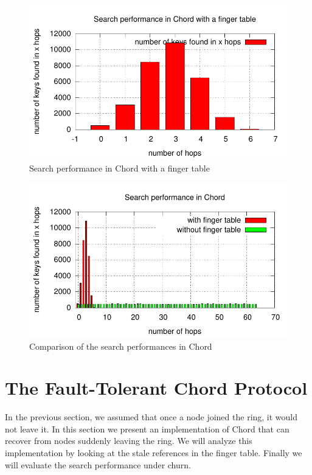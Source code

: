 \message{ !name(LSDS_project2_hayezl.tex)}\documentclass[a4paper, 11pt]{article}
\theoremstyle{plain}
\theoremstyle{definition}
\begin{document}
    \begin{figure}[h]
      \centering
      \includegraphics{plots/task2-5-cluster.pdf}
      \caption{Search performance in Chord with a finger table}
      \label{fig:search-perf-chord-fing-table}
    \end{figure}

    \begin{figure}[h]
      \centering
      \includegraphics{plots/task2-5-cluster-compar.pdf}
      \caption{Comparison of the search performances in Chord}
      \label{fig:comp-search-chord}
    \end{figure}


\section{The Fault-Tolerant Chord Protocol}
\label{sec:fault-tolerant-chord}

  In the previous section, we assumed that once a node joined the ring, it would not leave it. In this section
  we present an implementation of Chord that can recover from nodes suddenly leaving the ring. We will analyze
  this implementation by looking at the stale references in the finger table. Finally we will evaluate the
  search performance under churn.
\end{document}
